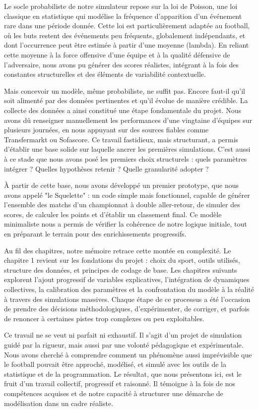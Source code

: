 \documentclass[12pt]{report}
\begin{document}
Le socle probabiliste de notre simulateur repose sur la loi de Poisson, une loi classique en statistique qui modélise la fréquence d’apparition d’un événement rare dans une période donnée. Cette loi est particulièrement adaptée au football, où les buts restent des événements peu fréquents, globalement indépendants, et dont l’occurrence peut être estimée à partir d’une moyenne (lambda). En reliant cette moyenne à la force offensive d’une équipe et à la qualité défensive de l’adversaire, nous avons pu générer des scores réalistes, intégrant à la fois des constantes structurelles et des éléments de variabilité contextuelle.

Mais concevoir un modèle, même probabiliste, ne suffit pas. Encore faut-il qu’il soit alimenté par des données pertinentes et qu’il évolue de manière crédible. La collecte des données a ainsi constitué une étape fondamentale du projet. Nous avons dû renseigner manuellement les performances d’une vingtaine d’équipes sur plusieurs journées, en nous appuyant sur des sources fiables comme Transfermarkt ou Sofascore. Ce travail fastidieux, mais structurant, a permis d’établir une base solide sur laquelle ancrer les premières simulations. C’est aussi à ce stade que nous avons posé les premiers choix structurels : quels paramètres intégrer ? Quelles hypothèses retenir ? Quelle granularité adopter ?

À partir de cette base, nous avons développé un premier prototype, que nous avons appelé "le Squelette" : un code simple mais fonctionnel, capable de générer l’ensemble des matchs d’un championnat à double aller-retour, de simuler des scores, de calculer les points et d’établir un classement final. Ce modèle minimaliste nous a permis de vérifier la cohérence de notre logique initiale, tout en préparant le terrain pour des enrichissements progressifs.

Au fil des chapitres, notre mémoire retrace cette montée en complexité. Le chapitre 1 revient sur les fondations du projet : choix du sport, outils utilisés, structure des données, et principes de codage de base. Les chapitres suivants explorent l’ajout progressif de variables explicatives, l’intégration de dynamiques collectives, la calibration des paramètres et la confrontation du modèle à la réalité à travers des simulations massives. Chaque étape de ce processus a été l’occasion de prendre des décisions méthodologiques, d’expérimenter, de corriger, et parfois de renoncer à certaines pistes trop complexes ou peu exploitables.

Ce travail ne se veut ni parfait ni exhaustif. Il s’agit d’un projet de simulation guidé par la rigueur, mais aussi par une volonté pédagogique et expérimentale. Nous avons cherché à comprendre comment un phénomène aussi imprévisible que le football pouvait être approché, modélisé, et simulé avec les outils de la statistique et de la programmation. Le résultat, que nous présentons ici, est le fruit d’un travail collectif, progressif et raisonné. Il témoigne à la fois de nos compétences acquises et de notre capacité à structurer une démarche de modélisation dans un cadre réaliste.
\end{document}
